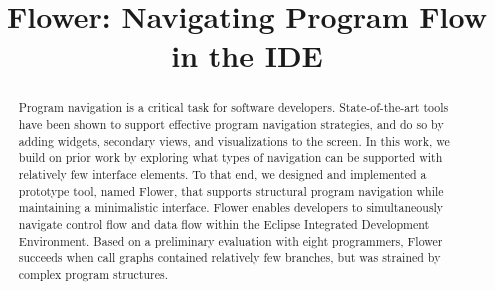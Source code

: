 \documentclass[conference]{IEEEtran}
\begin{document}
%
\title{Flower: Navigating Program Flow in the IDE}



\author{
}


\maketitle

\begin{abstract}
Program navigation is a critical task for software developers. 
State-of-the-art tools have been shown to support effective program navigation strategies, and do so by adding widgets, secondary views, and visualizations to the screen. 
In this work, we build on prior work by exploring what types of navigation can be supported with relatively few interface elements.
To that end, we designed and implemented a prototype tool, named Flower, that supports structural program navigation while maintaining a minimalistic interface.
Flower enables developers to simultaneously navigate control flow and data flow within the Eclipse Integrated Development Environment.
Based on a preliminary evaluation with eight programmers, Flower succeeds when call graphs contained relatively few branches, but was strained by complex program structures.
\end{abstract}
\end{document}
